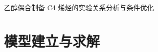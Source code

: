 \documentclass[12pt,a4paper]{ctexart}
\begin{document}
\begin{center}
{\heiti\fontsize{16pt}{19pt}\selectfont
乙醇偶合制备 C4 烯烃的实验关系分析与条件优化}
\end{center}
\vspace{18pt}






\section{模型建立与求解}\label{sec:model}

\FloatBarrier

\FloatBarrier

\FloatBarrier

\FloatBarrier



\end{document}
